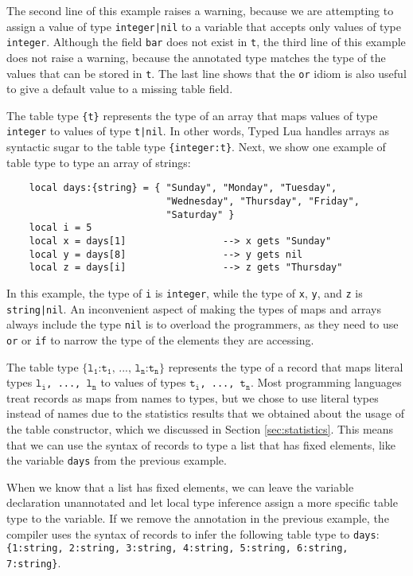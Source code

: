 The second line of this example raises a warning, because we are
attempting to assign a value of type \texttt{integer|nil} to a
variable that accepts only values of type \texttt{integer}.
Although the field \texttt{bar} does not exist in \texttt{t}, the third
line of this example does not raise a warning, because the
annotated type matches the type of the values that can be stored in
\texttt{t}.
The last line shows that the \texttt{or} idiom is also useful to
give a default value to a missing table field.

The table type \texttt{\{t\}} represents the type of an array that 
maps values of type \texttt{integer} to values of type \texttt{t|nil}.
In other words, Typed Lua handles arrays as syntactic sugar to the
table type \texttt{\{integer:t\}}.
Next, we show one example of table type to type an array of strings:
\begin{verbatim}
    local days:{string} = { "Sunday", "Monday", "Tuesday",
                            "Wednesday", "Thursday", "Friday",
                            "Saturday" }
    local i = 5
    local x = days[1]                 --> x gets "Sunday"
    local y = days[8]                 --> y gets nil
    local z = days[i]                 --> z gets "Thursday"
\end{verbatim}

In this example, the type of \texttt{i} is \texttt{integer},
while the type of \texttt{x}, \texttt{y}, and \texttt{z} is
\texttt{string|nil}.
An inconvenient aspect of making the types of maps and arrays always
include the type \texttt{nil} is to overload the programmers,
as they need to use \texttt{or} or \texttt{if} to narrow the type of
the elements they are accessing.

The table type
$\texttt{\{l}{_\texttt{1}}\texttt{:t}_{\texttt{1}}
\texttt{, ..., l}{_\texttt{n}}\texttt{:t}_{\texttt{n}}\texttt{\}}$
represents the type of a record that maps literal types
$\texttt{l}_{\texttt{i}}$\texttt{, ..., }$\texttt{l}_{\texttt{n}}$
to values of types $\texttt{t}_{\texttt{i}}$\texttt{, ..., }$\texttt{t}_{\texttt{n}}$.
Most programming languages treat records as maps from names
to types, but we chose to use literal types instead of
names due to the statistics results that we obtained about
the usage of the table constructor, which we discussed in
Section \ref{sec:statistics}.
This means that we can use the syntax of records to type a
list that has fixed elements, like the variable \texttt{days} from
the previous example.

When we know that a list has fixed elements, we can leave the
variable declaration unannotated and let local type inference assign
a more specific table type to the variable.
If we remove the annotation in the previous example, the compiler uses the
syntax of records to infer the following table type to \texttt{days}:
\texttt{\{1:string, 2:string, 3:string, 4:string, 5:string, 6:string, 7:string\}}.

